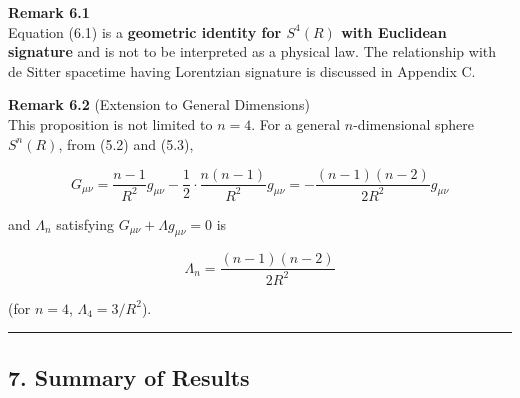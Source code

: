 \documentclass[a4paper,11pt]{article}
\theoremstyle{definition}
\begin{document}
\textbf{Remark 6.1}\\
Equation (6.1) is a \textbf{geometric identity for \(S^4(R)\) with Euclidean signature} and is not to be interpreted as a physical law. The relationship with de Sitter spacetime having Lorentzian signature is discussed in Appendix C.

\textbf{Remark 6.2} (Extension to General Dimensions)\\
This proposition is not limited to \(n=4\). For a general \(n\)-dimensional sphere \(S^n(R)\), from (5.2) and (5.3),

\[G_{\mu\nu} = \frac{n-1}{R^2}g_{\mu\nu} - \frac{1}{2}\cdot\frac{n(n-1)}{R^2}g_{\mu\nu} = -\frac{(n-1)(n-2)}{2R^2}g_{\mu\nu}\]

and \(\Lambda_n\) satisfying \(G_{\mu\nu} + \Lambda g_{\mu\nu} = 0\) is

\[\Lambda_n = \frac{(n-1)(n-2)}{2R^2}\]

(for \(n=4\), \(\Lambda_4 = 3/R^2\)).

\begin{center}\rule{0.5\linewidth}{0.5pt}\end{center}

\subsection{7. Summary of Results}\label{summary-of-results}
\end{document}

